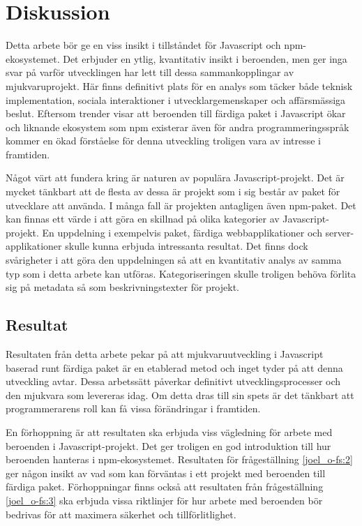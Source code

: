 \section{Diskussion}
\label{sec:joel_o-discussion}
Detta arbete bör ge en viss insikt i tillståndet för Javascript och npm-ekosystemet. Det erbjuder en ytlig, kvantitativ insikt i beroenden, men ger inga svar på varför utvecklingen har lett till dessa sammankopplingar av mjukvaruprojekt. Här finns definitivt plats för en analys som täcker både teknisk implementation, sociala interaktioner i utvecklargemenskaper och affärsmässiga beslut. Eftersom trender visar att beroenden till färdiga paket i Javascript ökar~\cite{Wittern:2016} och liknande ekosystem som npm existerar även för andra programmeringsspråk kommer en ökad förståelse för denna utveckling troligen vara av intresse i framtiden.

Något värt att fundera kring är naturen av populära Javascript-projekt. Det är mycket tänkbart att de flesta av dessa är projekt som i sig består av paket för utvecklare att använda. I många fall är projekten antagligen även npm-paket. Det kan finnas ett värde i att göra en skillnad på olika kategorier av Javascript-projekt. En uppdelning i exempelvis paket, färdiga webbapplikationer och server-applikationer skulle kunna erbjuda intressanta resultat. Det finns dock svårigheter i att göra den uppdelningen så att en kvantitativ analys av samma typ som i detta arbete kan utföras. Kategoriseringen skulle troligen behöva förlita sig på metadata så som beskrivningstexter för projekt.

\subsection{Resultat}
\label{subsec:joel_o-discussion-results}
Resultaten från detta arbete pekar på att mjukvaruutveckling i Javascript baserad runt färdiga paket är en etablerad metod och inget tyder på att denna utveckling avtar. Dessa arbetssätt påverkar definitivt utvecklingsprocesser och den mjukvara som levereras idag. Om detta dras till sin spets är det tänkbart att programmerarens roll kan få vissa förändringar i framtiden.

En förhoppning är att resultaten ska erbjuda viss vägledning för arbete med beroenden i Javascript-projekt. Det ger troligen en god introduktion till hur beroenden hanteras i npm-ekosystemet. Resultaten för frågeställning \ref{joel_o-fs:2} ger någon insikt av vad som kan förväntas i ett projekt med beroenden till färdiga paket. Förhoppningar finns också att resultaten från frågeställning \ref{joel_o-fs:3} ska erbjuda vissa riktlinjer för hur arbete med beroenden bör bedrivas för att maximera säkerhet och tillförlitlighet.

